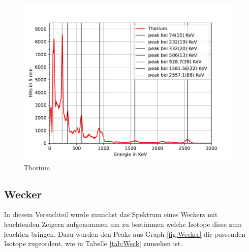\documentclass[11pt, a4paper]{article}
\begin{document}
    \begin{figure}[!h]
        \centering
        \includegraphics[width=\textwidth]{Plots/Thorium.pdf}
        \caption{Thorium}
        \label{fig:thor}
    \end{figure}

    

    
    \FloatBarrier
    \subsection{Wecker}
    In diesem Versuchteil wurde zunächst das Spektrum eines Weckers mit leuchtenden Zeigern aufgenommen um zu bestimmen welche Isotope diese zum leuchten bringen.
    Dazu wurden den Peaks aus Graph \ref{fig:Wecker} die passenden Isotope zugeordent, wie in Tabelle \ref{tab:Weck} zunsehen ist.
\end{document}
